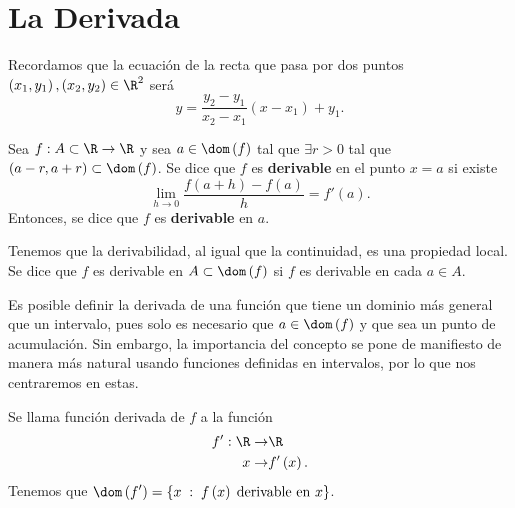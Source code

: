 \chapter{La Derivada}
Recordamos que la ecuación de la recta que pasa por dos puntos $\displaystyle \left(x_{1}, y_{1}\right), \left(x_{2}, y_{2}\right) \in \R^{2} $ será
\[ y = \frac{y_{2}-y_{1}}{x_{2}-x_{1}}\left(x - x_{1}\right) + y_{1} .\]
\begin{fdefinition}[Derivada]
\normalfont Sea $\displaystyle f : A \subset \R \to \R $ y sea $\displaystyle a \in \dom\left(f\right) $ tal que $\displaystyle \exists r > 0 $ tal que $\displaystyle \left(a-r, a + r\right) \subset \dom\left(f\right) $. Se dice que $\displaystyle f $ es \textbf{derivable} en el punto $\displaystyle x = a $ si existe 
\[\lim_{h \to 0}\frac{f\left(a + h\right)-f\left(a\right)}{h} = f'\left(a\right) .\]
Entonces, se dice que $\displaystyle f $ es \textbf{derivable} en $\displaystyle a $. 
\end{fdefinition}
\begin{observation}
\normalfont Tenemos que la derivabilidad, al igual que la continuidad, es una propiedad local. Se dice que $\displaystyle f $ es derivable en $\displaystyle A \subset \dom\left(f\right) $ si $\displaystyle f $ es derivable en cada $\displaystyle a \in A $.
\end{observation}
\begin{observation}
\normalfont Es posible definir la derivada de una función que tiene un dominio más general que un intervalo, pues solo es necesario que $\displaystyle a \in \dom\left(f\right) $ y que sea un punto de acumulación. Sin embargo, la importancia del concepto se pone de manifiesto de manera más natural usando funciones definidas en intervalos, por lo que nos centraremos en estas.
\end{observation}
\begin{observation}
\normalfont 
Se llama función derivada de $\displaystyle f $ a la función 
\[
\begin{split}
	f' : \R \to & \R \\
	x \to & f'\left(x\right).
\end{split}
\]
Tenemos que $\displaystyle \dom\left(f'\right) = \left\{ x \; : \; f\left(x\right) \; \text{derivable en }x\right\}  $.
\end{observation}
